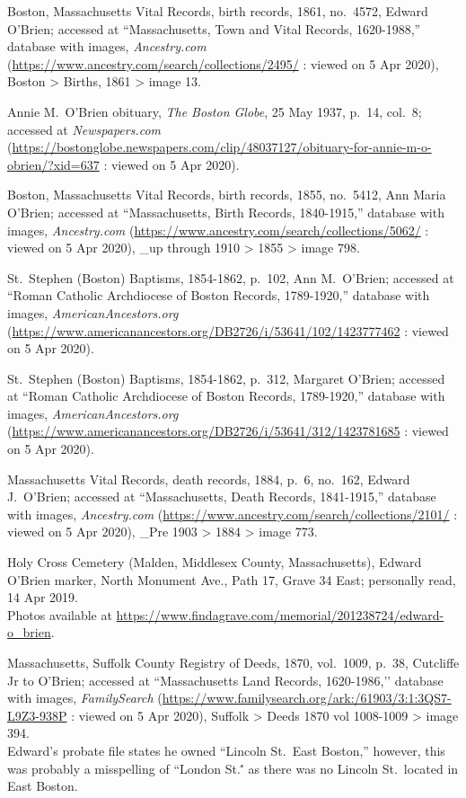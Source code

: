 \begin{thebibliography}{999}
	Boston, Massachusetts Vital Records, birth records, 1861, no.\ 4572, Edward O'Brien; accessed at ``Massachusetts, Town and Vital Records, 1620-1988,'' database with images, \textit{Ancestry.com} (\url{https://www.ancestry.com/search/collections/2495/} : viewed on 5 Apr 2020), Boston > Births, 1861 > image 13.

	Annie M.\ O'Brien obituary, \textit{The Boston Globe}, 25 May 1937, p.\ 14, col.\ 8; accessed at \textit{Newspapers.com} (\url{https://bostonglobe.newspapers.com/clip/48037127/obituary-for-annie-m-o-obrien/?xid=637} : viewed on 5 Apr 2020).
	
	Boston, Massachusetts Vital Records, birth records, 1855, no.\ 5412, Ann Maria O'Brien; accessed at ``Massachusetts, Birth Records, 1840-1915,'' database with images, \textit{Ancestry.com} (\url{https://www.ancestry.com/search/collections/5062/} : viewed on 5 Apr 2020), \_up through 1910 > 1855 > image 798.
	
	St.\ Stephen (Boston) Baptisms, 1854-1862, p.\ 102, Ann M.\ O'Brien; accessed at ``Roman Catholic Archdiocese of Boston Records, 1789-1920,'' database with images, \textit{AmericanAncestors.org} (\url{https://www.americanancestors.org/DB2726/i/53641/102/1423777462} : viewed on 5 Apr 2020).
	
	St.\ Stephen (Boston) Baptisms, 1854-1862, p.\ 312, Margaret O'Brien; accessed at ``Roman Catholic Archdiocese of Boston Records, 1789-1920,'' database with images, \textit{AmericanAncestors.org} (\url{https://www.americanancestors.org/DB2726/i/53641/312/1423781685} : viewed on 5 Apr 2020).	
	
	Massachusetts Vital Records, death records, 1884, p.\ 6, no.\ 162, Edward J.\ O'Brien; accessed at ``Massachusetts, Death Records, 1841-1915,'' database with images, \textit{Ancestry.com} (\url{https://www.ancestry.com/search/collections/2101/} : viewed on 5 Apr 2020), \_Pre 1903 > 1884 > image 773.	
	
	Holy Cross Cemetery (Malden, Middlesex County, Massachusetts), Edward O'Brien marker, North Monument Ave., Path 17, Grave 34 East; personally read, 14 Apr 2019. \\
	Photos available at \url{https://www.findagrave.com/memorial/201238724/edward-o_brien}.

	Massachusetts, Suffolk County Registry of Deeds, 1870, vol.\ 1009, p.\ 38, Cutcliffe Jr to O’Brien; accessed at ``Massachusetts Land Records, 1620-1986,’’ database with images, \textit{FamilySearch} (\url{https://www.familysearch.org/ark:/61903/3:1:3QS7-L9Z3-938P} : viewed on 5 Apr 2020), Suffolk > Deeds 1870 vol 1008-1009 > image 394.\\
	Edward's probate file states he owned ``Lincoln St.\  East Boston,'' however, this was probably a misspelling of ``London St.\'' as there was no Lincoln St.\ located in East Boston.\cite{EastBostonStreets}
	

\end{thebibliography}

